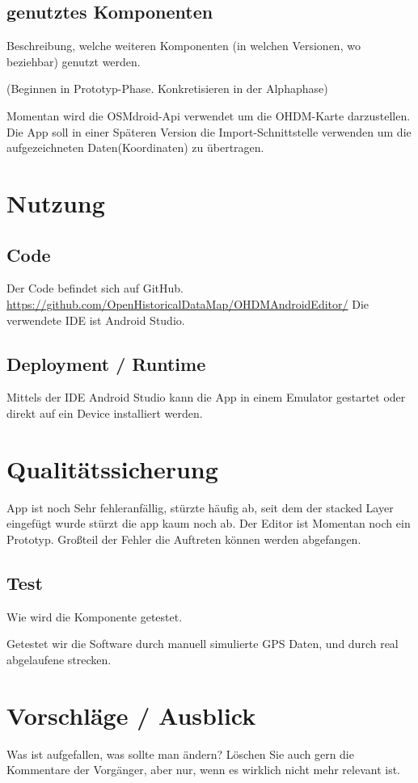 \subsection{genutztes Komponenten}
Beschreibung, welche weiteren Komponenten (in welchen Versionen, wo beziehbar) genutzt werden.

(Beginnen in Prototyp-Phase. Konkretisieren in der Alphaphase)

Momentan wird die OSMdroid-Api verwendet um die OHDM-Karte darzustellen.
Die App soll in einer Späteren Version die Import-Schnittstelle verwenden um die aufgezeichneten Daten(Koordinaten) zu übertragen.

\section{Nutzung}
\subsection{Code}
Der Code befindet sich auf GitHub. \url{https://github.com/OpenHistoricalDataMap/OHDMAndroidEditor/}
Die verwendete IDE ist Android Studio.

\subsection{Deployment / Runtime}
Mittels der IDE Android Studio kann die App in einem Emulator gestartet oder direkt auf ein Device installiert werden.

\section{Qualitätssicherung}

App ist noch Sehr fehleranfällig, stürzte häufig ab, seit dem der stacked Layer eingefügt wurde stürzt die app kaum noch ab. Der Editor ist Momentan noch ein Prototyp.
Großteil der Fehler die Auftreten können werden abgefangen.

\subsection{Test}
Wie wird die Komponente getestet.

Getestet wir die Software durch manuell simulierte GPS Daten, und durch real abgelaufene strecken.

\section{Vorschläge / Ausblick}
Was ist aufgefallen, was sollte man ändern? Löschen Sie auch gern die Kommentare
der Vorgänger, aber nur, wenn es wirklich nicht mehr relevant ist.

